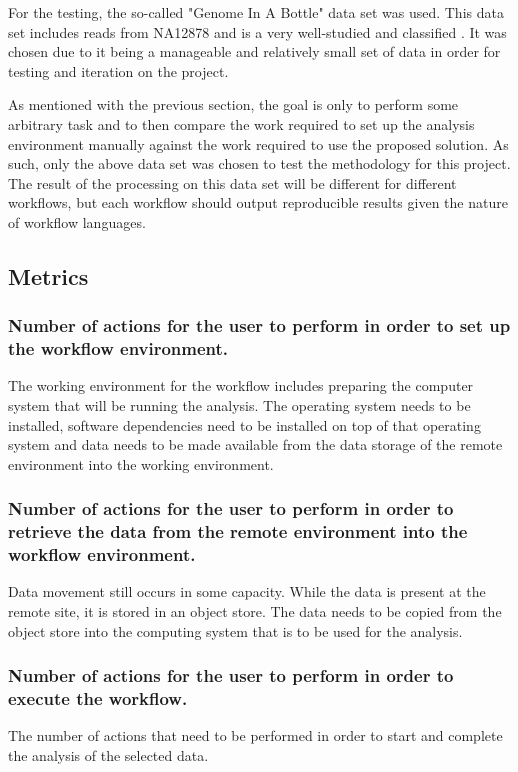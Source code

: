 For the testing, the so-called "Genome In A Bottle" data set was used. This data set includes reads from NA12878 and is a very well-studied and classified \parencite{paajanen2017critical}. It was chosen due to it being a manageable and relatively small set of data in order for testing and iteration on the project. 

As mentioned with the previous section, the goal is only to perform some arbitrary task and to then compare the work required to set up the analysis environment manually against the work required to use the proposed solution. As such, only the above data set was chosen to test the methodology for this project. The result of the processing on this data set will be different for different workflows, but each workflow should output reproducible results given the nature of workflow languages.

\subsection{Metrics}

\subsubsection{Number of actions for the user to perform in order to set up the workflow environment.}
The working environment for the workflow includes preparing the computer system that will be running the analysis. The operating system needs to be installed, software dependencies need to be installed on top of that operating system and data needs to be made available from the data storage of the remote environment into the working environment.

\subsubsection{Number of actions for the user to perform in order to retrieve the data from the remote environment into the workflow environment.}
Data movement still occurs in some capacity. While the data is present at the remote site, it is stored in an object store. The data needs to be copied from the object store into the computing system that is to be used for the analysis.

\subsubsection{Number of actions for the user to perform in order to execute the workflow.}
The number of actions that need to be performed in order to start and complete the analysis of the selected data.

